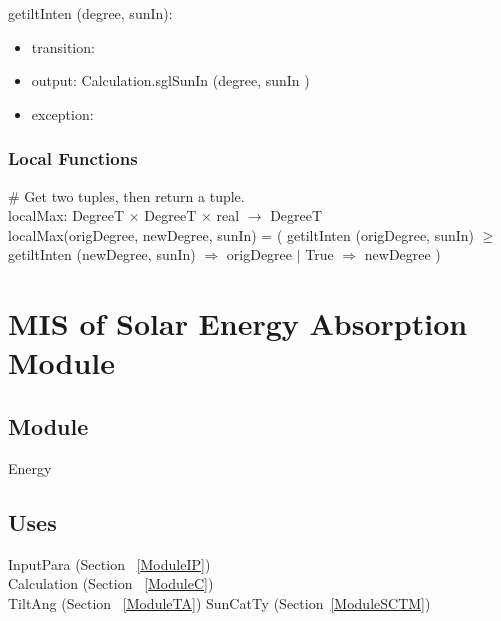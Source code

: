 \documentclass[12pt, titlepage]{article}
\begin{document}
\noindent getiltInten (degree, sunIn):
\begin{itemize}
\item transition:
\item output: Calculation.sglSunIn (degree, sunIn )
\item exception: 
\end{itemize}




\subsubsection{Local Functions}

$\#$ Get two tuples, then return a tuple.\\
localMax: DegreeT $\times$ DegreeT $\times$ real $\rightarrow$ DegreeT\\
localMax(origDegree, newDegree, sunIn) = ( getiltInten (origDegree, sunIn) $\geq$ getiltInten (newDegree, sunIn) $\Rightarrow$ origDegree $|$ True $\Rightarrow$ newDegree )\\


 




\newpage



\section{MIS of Solar Energy Absorption Module} \label{ModuleE} 

\subsection{Module}
Energy

\subsection{Uses}
InputPara (Section ~\ref{ModuleIP})\\
Calculation (Section ~\ref{ModuleC})\\
TiltAng (Section ~\ref{ModuleTA})
SunCatTy (Section~\ref{ModuleSCTM}) \\
\end{document}
